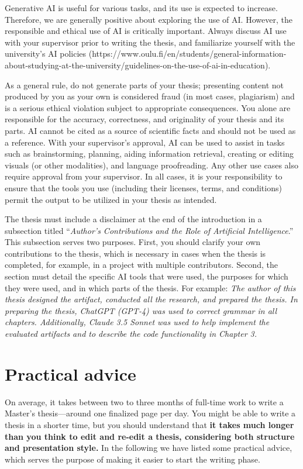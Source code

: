 Generative AI is useful for various tasks, and its use is expected to
increase. Therefore, we are generally positive about exploring the
use of AI. However, the responsible and ethical use of AI is
critically important. Always discuss AI use with your supervisor
prior to writing the thesis, and familiarize yourself with the
university's AI policies
(https://www.oulu.fi/en/students/general-information-about-studying-at-the-university/guidelines-on-the-use-of-ai-in-education).

As a general rule, do not generate parts of your thesis; presenting
content not produced by you as your own is considered fraud (in most
cases, plagiarism) and is a serious ethical violation subject to
appropriate consequences. You alone are responsible for the accuracy,
correctness, and originality of your thesis and its parts. AI cannot
be cited as a source of scientific facts and should not be used as a
reference. With your supervisor's approval, AI can be used to assist
in tasks such as brainstorming, planning, aiding information
retrieval, creating or editing visuals (or other modalities), and
language proofreading. Any other use cases also require approval from
your supervisor. In all cases, it is your responsibility to ensure
that the tools you use (including their licenses, terms, and
conditions) permit the output to be utilized in your thesis as intended.

The thesis must include a disclaimer at the end of the introduction
in a subsection titled ``\textit{Author's Contributions and the Role
of Artificial Intelligence}.'' This subsection serves two purposes.
First, you should clarify your own contributions to the thesis, which
is necessary in cases when the thesis is completed, for example, in a
project with multiple contributors. Second, the section must detail
the specific AI tools that were used, the purposes for which they
were used, and in which parts of the thesis. For example: \textit{The
author of this thesis designed the artifact, conducted all the
research, and prepared the thesis. In preparing the thesis, ChatGPT
(GPT-4) was used to correct grammar in all chapters. Additionally,
Claude 3.5 Sonnet was used to help implement the evaluated artifacts
and to describe the code functionality in Chapter 3.}

\section{Practical advice}

On average, it takes between two to three months of full-time work to
write a Master’s thesis---around one finalized page per day. You
might be able to write a thesis in a shorter time, but you should
understand that \textbf{it takes much longer than you think to edit
and re-edit a thesis, considering both structure and presentation
style.} In the following we have listed some practical advice, which
serves the purpose of making it easier to start the writing phase.

